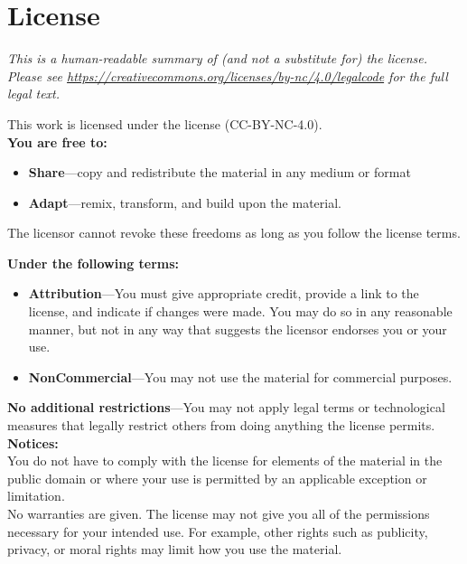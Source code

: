 \chapter{License}\label{s:license}

{\setlength{\parindent}{0em}

\emph{
  This is a human-readable summary of (and not a substitute for) the license.
  Please see \url{https://creativecommons.org/licenses/by-nc/4.0/legalcode} for the full legal text.
}

\vspace{\baselineskip}

\noindent
This work is licensed under the
 license
(CC-BY-NC-4.0).\\

\noindent
\textbf{You are free to:}

\begin{itemize}
\item
  \textbf{Share}---copy and redistribute the material in any medium or
  format
\item
  \textbf{Adapt}---remix, transform, and build upon the material.
\end{itemize}

The licensor cannot revoke these freedoms as long as you follow the
license terms.

\textbf{Under the following terms:}

\begin{itemize}
\item
  \textbf{Attribution}---You must give appropriate credit, provide a link
  to the license, and indicate if changes were made. You may do so in
  any reasonable manner, but not in any way that suggests the licensor
  endorses you or your use. \\
\item
  \textbf{NonCommercial}---You may not use the material for commercial purposes.
\end{itemize}

\textbf{No additional restrictions}---You may not apply legal terms or
technological measures that legally restrict others from doing anything the
license permits.\\

\textbf{Notices:}\\

You do not have to comply with the license for elements of the
material in the public domain or where your use is permitted by an
applicable exception or limitation.\\

No warranties are given. The license may not give you all of the
permissions necessary for your intended use. For example, other rights
such as publicity, privacy, or moral rights may limit how you use the
material.

}
